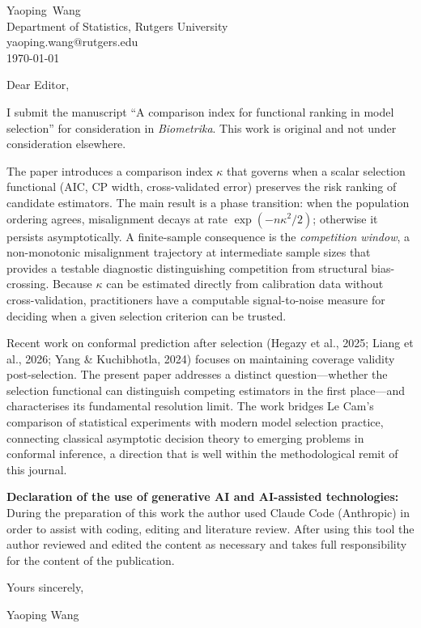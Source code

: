\documentclass[11pt]{article}
\begin{document}
\begin{flushright}
Yaoping~Wang \\
Department of Statistics, Rutgers University \\
yaoping.wang@rutgers.edu \\
\today
\end{flushright}

\vspace{2mm}

Dear Editor,

I submit the manuscript ``A comparison index for functional ranking in model selection'' for consideration in {\it Biometrika}.  This work is original and not under consideration elsewhere.

The paper introduces a comparison index $\kappa$ that governs when a scalar selection functional (AIC, CP width, cross-validated error) preserves the risk ranking of candidate estimators.  The main result is a phase transition: when the population ordering agrees, misalignment decays at rate $\exp(-n\kappa^2/2)$; otherwise it persists asymptotically.  A finite-sample consequence is the {\it competition window}, a non-monotonic misalignment trajectory at intermediate sample sizes that provides a testable diagnostic distinguishing competition from structural bias-crossing.  Because $\kappa$ can be estimated directly from calibration data without cross-validation, practitioners have a computable signal-to-noise measure for deciding when a given selection criterion can be trusted.

Recent work on conformal prediction after selection (Hegazy et al., 2025; Liang et al., 2026; Yang \& Kuchibhotla, 2024) focuses on maintaining coverage validity post-selection.  The present paper addresses a distinct question---whether the selection functional can distinguish competing estimators in the first place---and characterises its fundamental resolution limit.  The work bridges Le Cam's comparison of statistical experiments with modern model selection practice, connecting classical asymptotic decision theory to emerging problems in conformal inference, a direction that is well within the methodological remit of this journal.

\vspace{3mm}
{\bf Declaration of the use of generative AI and AI-assisted technologies:}
During the preparation of this work the author used Claude Code (Anthropic) in order to assist with coding, editing and literature review.  After using this tool the author reviewed and edited the content as necessary and takes full responsibility for the content of the publication.

\vspace{5mm}

Yours sincerely,

Yaoping Wang
\end{document}

